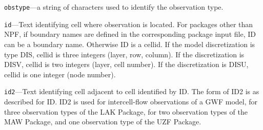 \item \texttt{obstype}---a string of characters used to identify the observation type.

\item \texttt{id}---Text identifying cell where observation is located. For packages other than NPF, if boundary names are defined in the corresponding package input file, ID can be a boundary name. Otherwise ID is a cellid. If the model discretization is type DIS, cellid is three integers (layer, row, column). If the discretization is DISV, cellid is two integers (layer, cell number). If the discretization is DISU, cellid is one integer (node number).

\item \texttt{id2}---Text identifying cell adjacent to cell identified by ID. The form of ID2 is as described for ID. ID2 is used for intercell-flow observations of a GWF model, for three observation types of the LAK Package, for two observation types of the MAW Package, and one observation type of the UZF Package.



